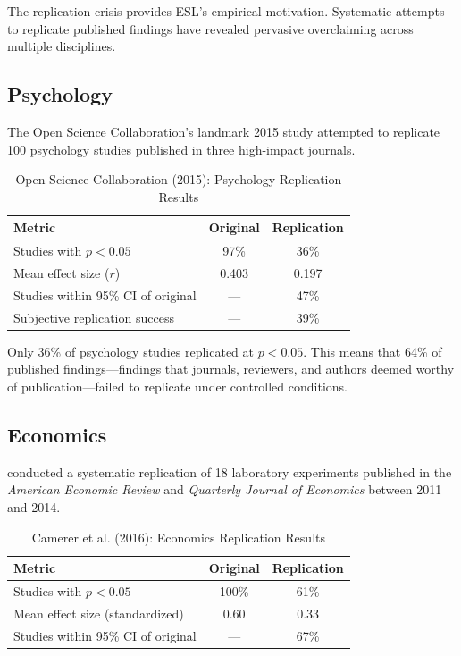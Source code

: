 \documentclass[11pt,a4paper]{article}
\begin{document}
The replication crisis provides ESL's empirical motivation. Systematic attempts to replicate published findings have revealed pervasive overclaiming across multiple disciplines.

\subsection{Psychology}

The Open Science Collaboration's landmark 2015 study \citep{OpenScienceCollaboration2015} attempted to replicate 100 psychology studies published in three high-impact journals.

\begin{table}[h]
\centering
\caption{Open Science Collaboration (2015): Psychology Replication Results}
\label{tab:osc2015}
\begin{tabular}{lcc}
\toprule
\textbf{Metric} & \textbf{Original} & \textbf{Replication} \\
\midrule
Studies with $p < 0.05$ & 97\% & 36\% \\
Mean effect size ($r$) & 0.403 & 0.197 \\
Studies within 95\% CI of original & --- & 47\% \\
Subjective replication success & --- & 39\% \\
\bottomrule
\end{tabular}
\end{table}

\begin{keyinsight}[title={The 36\% Replication Rate}]
Only 36\% of psychology studies replicated at $p < 0.05$. This means that 64\% of published findings---findings that journals, reviewers, and authors deemed worthy of publication---failed to replicate under controlled conditions.
\end{keyinsight}

\subsection{Economics}

\citet{Camerer2016} conducted a systematic replication of 18 laboratory experiments published in the \textit{American Economic Review} and \textit{Quarterly Journal of Economics} between 2011 and 2014.

\begin{table}[h]
\centering
\caption{Camerer et al. (2016): Economics Replication Results}
\label{tab:camerer2016}
\begin{tabular}{lcc}
\toprule
\textbf{Metric} & \textbf{Original} & \textbf{Replication} \\
\midrule
Studies with $p < 0.05$ & 100\% & 61\% \\
Mean effect size (standardized) & 0.60 & 0.33 \\
Studies within 95\% CI of original & --- & 67\% \\
\bottomrule
\end{tabular}
\end{table}
\end{document}

